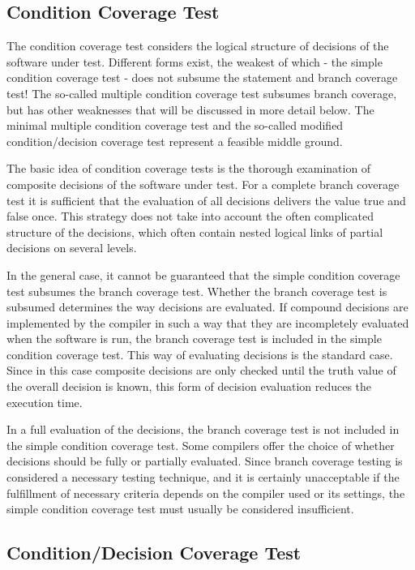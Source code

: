 	\subsection{Condition Coverage Test}

	The condition coverage test considers the logical structure of decisions of the software under test. Different forms exist, the weakest of which - the simple condition coverage test - does not subsume the statement and branch coverage test! The so-called multiple condition coverage test subsumes branch coverage, but has other weaknesses that will be discussed in more detail below. The minimal multiple condition coverage test and the so-called modified condition/decision coverage test represent a feasible middle ground.

	The basic idea of condition coverage tests is the thorough examination of composite decisions of the software under test. For a complete branch coverage test it is sufficient that the evaluation of all decisions delivers the value true and false once. This strategy does not take into account the often complicated structure of the decisions, which often contain nested logical links of partial decisions on several levels.

	In the general case, it cannot be guaranteed that the simple condition coverage test subsumes the branch coverage test. Whether the branch coverage test is subsumed determines the way decisions are evaluated. If compound decisions are implemented by the compiler in such a way that they are incompletely evaluated when the software is run, the branch coverage test is included in the simple condition coverage test. This way of evaluating decisions is the standard case. Since in this case composite decisions are only checked until the truth value of the overall decision is known, this form of decision evaluation reduces the execution time.

	In a full evaluation of the decisions, the branch coverage test is not included in the simple condition coverage test. Some compilers offer the choice of whether decisions should be fully or partially evaluated. Since branch coverage testing is considered a necessary testing technique, and it is certainly unacceptable if the fulfillment of necessary criteria depends on the compiler used or its settings, the simple condition coverage test must usually be considered insufficient.

	\subsection{Condition/Decision Coverage Test}

